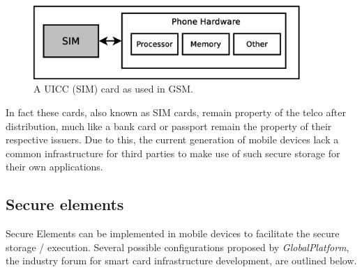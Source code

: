 \begin{figure}
\includegraphics[width=0.9\textwidth]{images/SIM_in_GSM}
\caption[UICC running SIM application in GSM]
{
A UICC (SIM) card as used in GSM.
}
\label{fig:gsm_sim}
\end{figure}

In fact these cards, also known as SIM cards, remain property of the telco after distribution, much like a bank card or passport remain the property of their respective issuers. %
Due to this, the current generation of mobile devices lack a common infrastructure for third parties to make use of such secure storage for their own applications.






\subsection{Secure elements}
Secure Elements can be implemented in mobile devices to facilitate the secure storage / execution.
Several possible configurations proposed by \textit{GlobalPlatform}, the industry forum for smart card infrastructure development, are outlined below. \cite{Reveilhac:2009:PSE:1548884.1549404,GlobalPlatformSEs}


